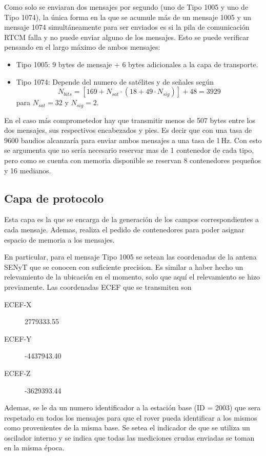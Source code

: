 \documentclass[a4paper,12pt,oneside,onecolumn,final,openright]{book}%
\begin{document}
	Como solo se enviaran dos mensajes por segundo (uno de Tipo 1005 y uno de Tipo 1074), la única forma en la que se acumule más de un mensaje 1005 y un mensaje 1074 simultáneamente para ser enviados es si la pila de comunicación RTCM falla y no puede enviar alguno de los mensajes. Esto se puede verificar pensando en el largo máximo de ambos mensajes:
\begin{itemize}
	\item Tipo 1005: 9 bytes de mensaje + 6 bytes adicionales a la capa de transporte. 
	\item Tipo 1074: Depende del numero de satélites y de señales según
\begin{equation*}
	N_{bits} = \left[169 + N_{sat}\cdot(18+49\cdot N_{sig})\right] + 48 = 3929
\end{equation*}
	para $N_{sat} = 32$ y $N_{sig} = 2$. 
\end{itemize}
	En el caso más comprometedor hay que transmitir menos de 507 bytes entre los dos mensajes, sus respectivos encabezados y pies. Es decir que con una tasa de 9600 baudios alcanzaría para enviar ambos mensajes a una tasa de 1\,Hz. Con esto se argumenta que no sería necesario reservar mas de 1 contenedor de cada tipo, pero como se cuenta con memoria disponible se reservan 8 contenedores pequeños y 16 medianos.
	
	
\subsection{Capa de protocolo}
		
	Esta capa es la que se encarga de la generación de los campos correspondientes a cada mensaje. Ademas, realiza el pedido de contenedores para poder asignar espacio de memoria a los mensajes. 
	
	 En particular, para el mensaje Tipo 1005 se setean las coordenadas de la antena SENyT que se conocen con suficiente precision. Es similar a haber hecho un relevamiento de la ubicación en el momento, solo que aquí el relevamiento se hizo previamente. Las coordenadas ECEF que se transmiten son
\begin{description}
	\item[ECEF-X] 2779333.55
	\item[ECEF-Y] -4437943.40
	\item[ECEF-Z] -3629393.44
\end{description}

	Ademas, se le da un numero identificador a la estación base (ID = 2003) que sera respetado en todos los mensajes para que el rover pueda identificar a los mismos como provenientes de la misma base. Se setea el indicador de que se utiliza un oscilador interno y se indica que todas las mediciones crudas enviadas se toman en la misma época.
	
\end{document}
